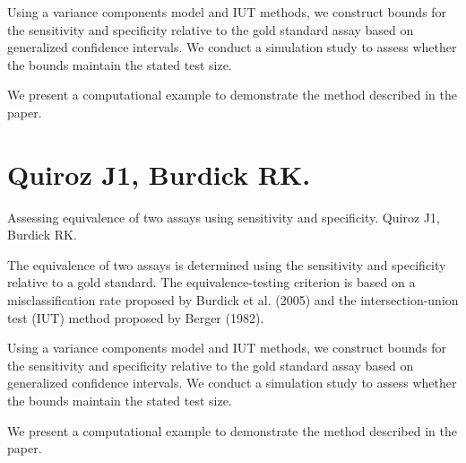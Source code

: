 Using a variance components model and IUT methods, we construct bounds for the sensitivity and specificity 
relative to the gold standard assay based on generalized confidence intervals. We conduct a simulation study 
to assess whether the bounds maintain the stated test size. 

We present a computational example to demonstrate the method described in the paper.





\chapter{Quiroz J1, Burdick RK.}
Assessing equivalence of two assays using sensitivity and specificity.
Quiroz J1, Burdick RK.


The equivalence of two assays is determined using the sensitivity and specificity relative to a gold standard.
The equivalence-testing criterion is based on a misclassification rate proposed by Burdick et al. (2005) and
the intersection-union test (IUT) method proposed by Berger (1982). 

Using a variance components model and IUT methods, we construct bounds for the sensitivity and specificity 
relative to the gold standard assay based on generalized confidence intervals. We conduct a simulation study 
to assess whether the bounds maintain the stated test size. 

We present a computational example to demonstrate the method described in the paper.
